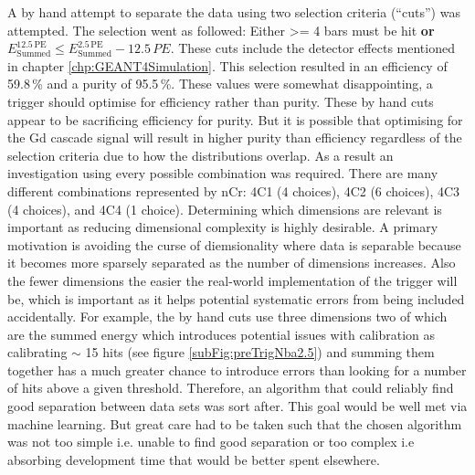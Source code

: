 A by hand attempt to separate the data using two selection criteria (``cuts'') was attempted. The selection went as followed: Either >= 4 bars must be hit \textbf{or} $E^{12.5\,\textrm{PE}}_\textrm{Summed} \leq E^{2.5\,\textrm{PE}}_\textrm{Summed} - 12.5\,PE$. These cuts include the detector effects mentioned in chapter \ref{chp:GEANT4Simulation}. This selection resulted in an efficiency of 59.8\,\% and a purity of 95.5\,\%. These values were somewhat disappointing, a trigger should optimise for efficiency rather than purity. These by hand cuts appear to be sacrificing efficiency for purity. But it is possible that optimising for the Gd cascade signal will result in higher purity than efficiency regardless of the selection criteria due to how the distributions overlap. As a result an investigation using every possible combination was required. There are many different combinations represented by nCr: 4C1 (4 choices), 4C2 (6 choices), 4C3 (4 choices), and 4C4 (1 choice). Determining which dimensions are relevant is important as reducing dimensional complexity is highly desirable. A primary motivation is avoiding the curse of diemsionality where data is separable because it becomes more sparsely separated as the number of dimensions increases. Also the fewer dimensions the easier the real-world implementation of the trigger will be, which is important as it helps potential systematic errors from being included accidentally. For example, the by hand cuts use three dimensions two of which are the summed energy which introduces potential issues with calibration as calibrating $\sim$ 15 hits (see figure \ref{subFig:preTrigNba2.5}) and summing them together has a much greater chance to introduce errors than looking for a number of hits above a given threshold. Therefore, an algorithm that could reliably find good separation between data sets was sort after. This goal would be well met via machine learning. But great care had to be taken such that the chosen algorithm was not too simple i.e. unable to find good separation or too complex i.e absorbing development time that would be better spent elsewhere. 
